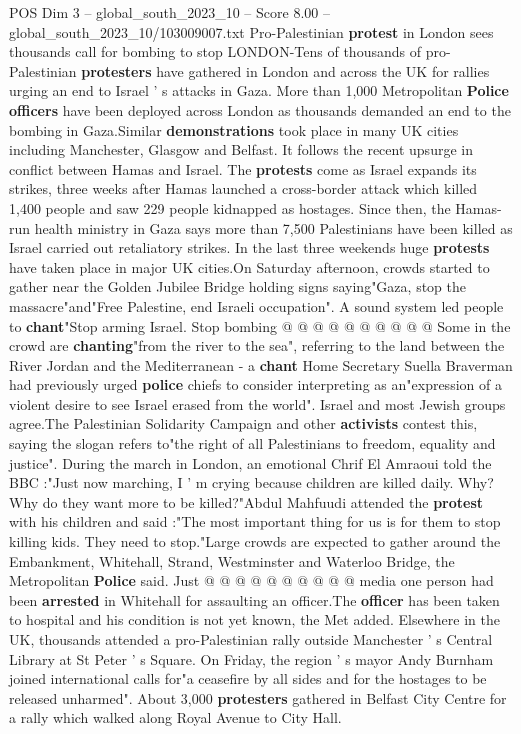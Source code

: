 \begin{textsample}{POS Dim 3 – global\_south\_2023\_10 – Score 8.00 – global\_south\_2023\_10/103009007.txt}  \label{ex:f3_pos_438}
Pro-Palestinian \textbf{protest} in London sees thousands call for bombing to stop LONDON-Tens of thousands of pro-Palestinian \textbf{protesters} have gathered in London and across the UK for rallies urging an end to Israel ' s attacks in Gaza.
More than 1,000 Metropolitan \textbf{Police} \textbf{officers} have been deployed across London as thousands demanded an end to the bombing in Gaza.Similar \textbf{demonstrations} took place in many UK cities including Manchester, Glasgow and Belfast.
It follows the recent upsurge in conflict between Hamas and Israel.
The \textbf{protests} come as Israel expands its strikes, three weeks after Hamas launched a cross-border attack which killed 1,400 people and saw 229 people kidnapped as hostages.
Since then, the Hamas-run health ministry in Gaza says more than 7,500 Palestinians have been killed as Israel carried out retaliatory strikes.
In the last three weekends huge \textbf{protests} have taken place in major UK cities.On Saturday afternoon, crowds started to gather near the Golden Jubilee Bridge holding signs saying"Gaza, stop the massacre"and"Free Palestine, end Israeli occupation".
A sound system led people to \textbf{chant}"Stop arming Israel.
Stop bombing @ @ @ @ @ @ @ @ @ @ Some in the crowd are \textbf{chanting}"from the river to the sea", referring to the land between the River Jordan and the Mediterranean - a \textbf{chant} Home Secretary Suella Braverman had previously urged \textbf{police} chiefs to consider interpreting as an"expression of a violent desire to see Israel erased from the world".
Israel and most Jewish groups agree.The Palestinian Solidarity Campaign and other \textbf{activists} contest this, saying the slogan refers to"the right of all Palestinians to freedom, equality and justice".
During the march in London, an emotional Chrif El Amraoui told the BBC :"Just now marching, I ' m crying because children are killed daily.
Why?
Why do they want more to be killed?"Abdul Mahfuudi attended the \textbf{protest} with his children and said :"The most important thing for us is for them to stop killing kids.
They need to stop."Large crowds are expected to gather around the Embankment, Whitehall, Strand, Westminster and Waterloo Bridge, the Metropolitan \textbf{Police} said.
Just @ @ @ @ @ @ @ @ @ @ media one person had been \textbf{arrested} in Whitehall for assaulting an officer.The \textbf{officer} has been taken to hospital and his condition is not yet known, the Met added.
Elsewhere in the UK, thousands attended a pro-Palestinian rally outside Manchester ' s Central Library at St Peter ' s Square.
On Friday, the region ' s mayor Andy Burnham joined international calls for"a ceasefire by all sides and for the hostages to be released unharmed".
About 3,000 \textbf{protesters} gathered in Belfast City Centre for a rally which walked along Royal Avenue to City Hall.

\end{textsample}
